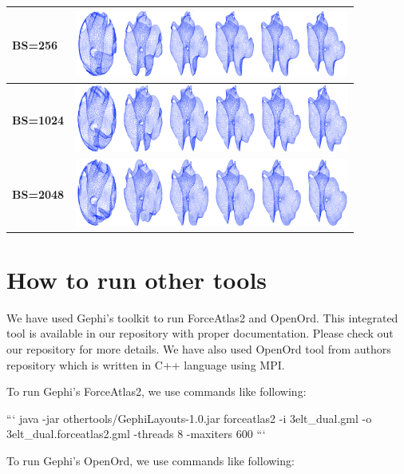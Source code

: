 \documentclass[conference]{article}
\begin{document}
\begin{table}[!htp]
\begin{tabular}{|p{1.7cm}|p{1.3cm}|p{1.3cm}|p{1.3cm}|p{1.3cm}|p{1.3cm}|p{1.3cm}|}
            \textbf{BS=256} & \multicolumn{6}{|c|}{\includegraphics[height=2.2cm,width=0.8\linewidth]{layouts/batches/batch256.png}}                              \\ \hline
    \textbf{BS=1024} & \multicolumn{6}{|c|}{\includegraphics[height=2.2cm,width=0.8\linewidth]{layouts/batches/batch1024.png}}                              \\ \hline
    \textbf{BS=2048} & \multicolumn{6}{|c|}{\includegraphics[height=2.2cm,width=0.8\linewidth]{layouts/batches/batch2048.png}}                              \\ \hline
            
\end{tabular}
\end{table}

\section{How to run other tools}

We have used Gephi's toolkit to run ForceAtlas2 and OpenOrd. This integrated tool is available in our repository with proper documentation. Please check out our repository for more details. We have also used OpenOrd tool from authors repository which is written in C++ language using MPI.

\noindent{}\noindent{}\noindent{}To run Gephi's ForceAtlas2, we use commands like following:

\begin{markdown}
```
java -jar othertools/GephiLayouts-1.0.jar forceatlas2 -i 3elt_dual.gml -o 3elt_dual.forceatlas2.gml -threads 8 -maxiters 600
```
\end{markdown}
\newline
\noindent{}\noindent{}\noindent{}To run Gephi's OpenOrd, we use commands like following:
\end{document}

